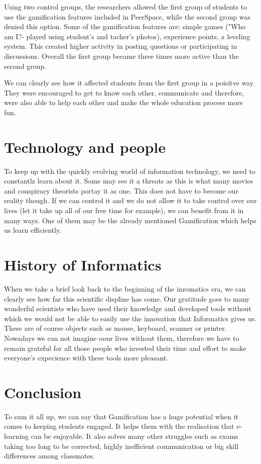 \documentclass[10pt,english,a4paper]{article}
\begin{document}
	Using two control groups, the researchers allowed the first group of students to use the gamification features included in PeerSpace, while the second group was denied this option.
	Some of the gamification features are: simple games ("Who am I?- played using student's and tacher's photos), experience points, a leveling system. 
	This created higher activity in posting questions or participating in discussions. Overall the first group became three times more active than the second group\cite{Li}. 
	
	We can clearly see how it affected students from the first group in a poisitve way. 
	They were encouraged to get to know each other, communicate and therefore, were also able to help each other and make the whole education process more fun.

\section{Technology and people} \label{Technologia a ludia}
	To keep up with the quickly evolving world of information technology, we need to constantlz learn about it.
	Some may see it a threats as this is what many movies and conspiracy theorists portay it as one. 
	This does not have to become our reality though. 
	If we can control it and we do not allow it to take control over our lives (let it take up all of our free time for example), we can benefit from it in many ways. 
	One of them may be the already mentioned Gamification which helps us learn efficiently. 


\section{History of Informatics} \label{Historia informatiky}
	When we take a brief look back to the beginning of the inromatics era, we can clearly see how far this scientific displine has come. 
	Our gratitude goes to many wonderful scientists who have used their knowledge and developed tools without which we would not be able to easily use the innovation that Informatics gives us.
	These are of course objects such as mouse, keyboard, scanner or printer. 
	Nowadays we can not imagine oour lives without them, therefore we have to remain grateful for all those people who invested their time and effort to make everyone's expecience with these tools more pleasant.

\section{Conclusion} \label{section5}
	To sum it all up, we can say that Gamification has a huge potential when it comes to keeping students engaged. 
	It helps them with the realisation that e-learning can be enjoyable.
	It also solves many other struggles such as exams taking too long to be corrected, highly inefficient communication or big skill differences among classmates.
	
\end{document}

